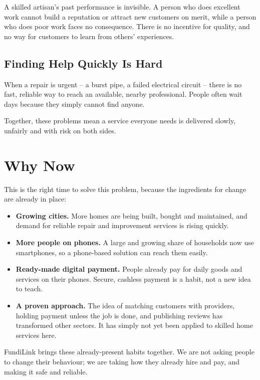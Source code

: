 \documentclass[11pt,a4paper]{article}
\begin{document}
A skilled artisan's past performance is invisible. A person who does excellent work cannot
build a reputation or attract new customers on merit, while a person who does poor work faces
no consequence. There is no incentive for quality, and no way for customers to learn from
others' experiences.

\subsection{Finding Help Quickly Is Hard}

When a repair is urgent -- a burst pipe, a failed electrical circuit -- there is no fast,
reliable way to reach an available, nearby professional. People often wait days because they
simply cannot find anyone.

Together, these problems mean a service everyone needs is delivered slowly, unfairly and with
risk on both sides.

\section{Why Now}

This is the right time to solve this problem, because the ingredients for change are already
in place:

\begin{itemize}[leftmargin=1.5em, label={--}]
    \item \textbf{Growing cities.} More homes are being built, bought and maintained, and
          demand for reliable repair and improvement services is rising quickly.
    \item \textbf{More people on phones.} A large and growing share of households now use
          smartphones, so a phone-based solution can reach them easily.
    \item \textbf{Ready-made digital payment.} People already pay for daily goods and
          services on their phones. Secure, cashless payment is a habit, not a new idea to
          teach.
    \item \textbf{A proven approach.} The idea of matching customers with providers, holding
          payment unless the job is done, and publishing reviews has transformed other
          sectors. It has simply not yet been applied to skilled home services here.
\end{itemize}

FundiLink brings these already-present habits together. We are not asking people to change
their behaviour; we are taking how they already hire and pay, and making it safe and reliable.
\end{document}

